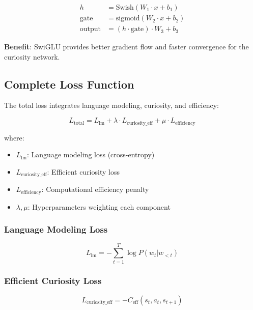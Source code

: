 \documentclass{IEEEtran}
\begin{document}
\begin{align}
h &= \text{Swish}(W_1 \cdot x + b_1) \\
\text{gate} &= \text{sigmoid}(W_2 \cdot x + b_2) \\
\text{output} &= (h \cdot \text{gate}) \cdot W_3 + b_3
\end{align}

\textbf{Benefit}: SwiGLU provides better gradient flow and faster convergence for the curiosity network.

\subsection{Complete Loss Function}

The total loss integrates language modeling, curiosity, and efficiency:

\begin{equation}
L_{\text{total}} = L_{\text{lm}} + \lambda \cdot L_{\text{curiosity\_eff}} + \mu \cdot L_{\text{efficiency}}
\end{equation}

where:
\begin{itemize}
    \item $L_{\text{lm}}$: Language modeling loss (cross-entropy)
    \item $L_{\text{curiosity\_eff}}$: Efficient curiosity loss
    \item $L_{\text{efficiency}}$: Computational efficiency penalty
    \item $\lambda, \mu$: Hyperparameters weighting each component
\end{itemize}

\subsubsection{Language Modeling Loss}

\begin{equation}
L_{\text{lm}} = -\sum_{t=1}^T \log P(w_t | w_{<t})
\end{equation}

\subsubsection{Efficient Curiosity Loss}

\begin{equation}
L_{\text{curiosity\_eff}} = -C_{\text{eff}}(s_t, a_t, s_{t+1})
\end{equation}
\end{document}
